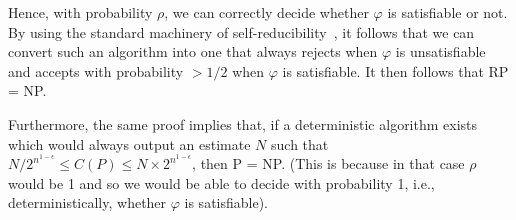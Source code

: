 \documentclass[acmsmall]{acmart}
\newcommand{\sharpP}{\#\mathsf{P}}
\begin{document}
Hence, with probability $\rho$, we can correctly decide whether $\varphi$ is satisfiable or not. By using the standard machinery of self-reducibility~\cite{aroraBarak}, it follows
that we can convert such an algorithm into one that always rejects when $\varphi$ is unsatisfiable and accepts with probability $> 1/2$ when $\varphi$ is satisfiable.
It then follows that RP = NP. 

Furthermore, the same proof implies that, if a deterministic algorithm exists
which would always output an estimate $N$ such that $N/2^{n^{1-\epsilon}} \le C(P) \le N \times 2^{n^{1-\epsilon}}$, then P = NP. (This is because in that case $\rho$ would be 1 and so we would be able to decide with probability 1, i.e., deterministically, whether
$\varphi$ is satisfiable).





\end{document}
